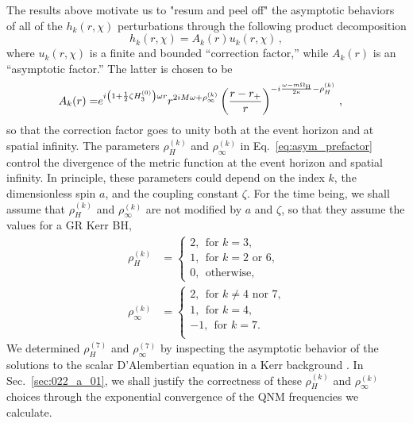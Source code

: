 \documentclass[aps,prx,amsmath,floats,floatfix,twocolumn,
  superscriptaddress,nofootinbib,showpacs]{revtex4-1}
\newcommand{\be}{\begin{equation}}
\newcommand{\ee}{\end{equation}}
\begin{document}
The results above motivate us to "resum and peel off" the asymptotic behaviors of all of the $h_k(r, \chi)$ perturbations through the following product decomposition
\be \label{eq:radspec}
h_k(r, \chi) = A_k(r)  u_k(r, \chi) \,,
\ee
where $u_k(r,\chi)$ is a finite and bounded ``correction factor,'' while $A_k(r)$ is an ``asymptotic factor.'' The latter is chosen to be
\begin{equation}\label{eq:asym_prefactor}
\begin{split}
A_k(r) = & e^{i \left(1 + \frac{1}{2} \zeta H_3^{(0)} \right)\omega r} r^{2 i M \omega  + \rho_{\infty}^{(k)}} \left( \frac{r-r_+}{r}\right)^{-i\frac{\omega - m \Omega_{\rm H}}{2 \kappa}- \rho_H^{(k)}}\,,
\end{split}
\end{equation}
so that the correction factor goes to unity both at the event horizon and at spatial infinity. The parameters $\rho_{H}^{(k)}$ and $\rho_{\infty}^{(k)}$ in Eq.~\eqref{eq:asym_prefactor} control the divergence of the metric function at the event horizon and spatial infinity. 
In principle, these parameters could depend on the index $k$, the dimensionless spin $a$, and the coupling constant $\zeta$.
For the time being, we shall assume that $\rho_{H}^{(k)}$ and $\rho_{\infty}^{(k)}$ are not modified by $a$ and $\zeta$, so that they assume the values for a GR Kerr BH, 
\begin{equation}\label{eq:rhos}
\begin{split}
\rho_H^{(k)} & = 
\begin{cases}
2, ~~ \text{for $k = 3$, }\\
1, ~~ \text{for $k = 2\text{  or  } 6$, }\\
0, ~~ \text{otherwise,}
\end{cases} \\
\rho_{\infty}^{(k)} & = 
\begin{cases}
2, ~~ \text{for $k \neq 4$ nor 7,}\\
1, ~~ \text{for $k = 4$,} \\
-1, ~~ \text{for $k = 7$.} \\
\end{cases}
\end{split} 
\end{equation}
We determined $\rho_{H}^{(7)}$ and $\rho_{\infty}^{(7)}$ by inspecting the asymptotic behavior of the solutions to the scalar D'Alembertian equation in a Kerr background \cite{Teukolsky_01_PRL, Teukolsky:1973ha}. 
In Sec.~\ref{sec:022_a_01}, we shall justify the correctness of these $\rho_{H}^{(k)}$ and $\rho_{\infty}^{(k)}$ choices through the exponential convergence of the QNM frequencies we calculate. 
\end{document}
